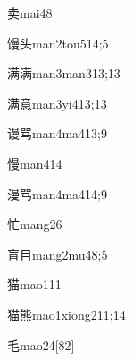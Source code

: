 \begin{verbete}{卖}{mai4}{8}
\end{verbete}

\begin{verbete}{馒头}{man2tou5}{14;5}
\end{verbete}

\begin{verbete}{满满}{man3man3}{13;13}
\end{verbete}

\begin{verbete}{满意}{man3yi4}{13;13}
\end{verbete}

\begin{verbete}{谩骂}{man4ma4}{13;9}
\end{verbete}

\begin{verbete}{慢}{man4}{14}
\end{verbete}

\begin{verbete}{漫骂}{man4ma4}{14;9}
\end{verbete}

\begin{verbete}{忙}{mang2}{6}
\end{verbete}

\begin{verbete}{盲目}{mang2mu4}{8;5}
\end{verbete}

\begin{verbete}{猫}{mao1}{11}
\end{verbete}

\begin{verbete}{猫熊}{mao1xiong2}{11;14}
\end{verbete}

\begin{verbete}{毛}{mao2}{4}[82]
\end{verbete}

